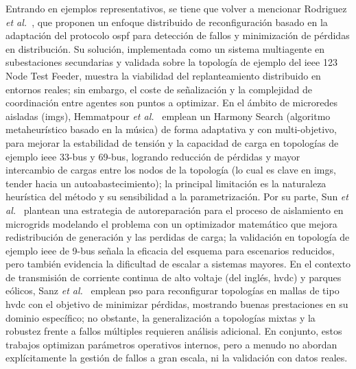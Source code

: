 Entrando en ejemplos representativos, se tiene que volver a mencionar Rodriguez \textit{et al.}~\cite{Rodriguez16}, que proponen un enfoque distribuido de reconfiguración basado en la adaptación del protocolo \gls{ospf} para detección de fallos y minimización de pérdidas en distribución. Su solución, implementada como un sistema multiagente en subestaciones secundarias y validada sobre la topología de ejemplo del \gls{ieee} 123 Node Test Feeder, muestra la viabilidad del replanteamiento distribuido en entornos reales; sin embargo, el coste de señalización y la complejidad de coordinación entre agentes son puntos a optimizar. En el ámbito de microredes aisladas (\gls{imgs}), Hemmatpour \textit{et al.}~\cite{hemmatpour2016optimum} emplean un Harmony Search (algoritmo metaheurístico basado en la música) de forma adaptativa y con multi-objetivo, para mejorar la estabilidad de tensión y la capacidad de carga en topologías de ejemplo \gls{ieee} 33-bus y 69-bus, logrando reducción de pérdidas y mayor intercambio de cargas entre los nodos de la topología (lo cual es clave en \gls{imgs}, tender hacia un autoabastecimiento); la principal limitación es la naturaleza heurística del método y su sensibilidad a la parametrización. Por su parte, Sun \textit{et al.}~\cite{sun2018optimal} plantean una estrategia de autoreparación para el proceso de aislamiento en microgrids modelando el problema con un optimizador matemático que mejora redistribución de generación y las perdidas de carga; la validación en topología de ejemplo \gls{ieee} de 9-bus señala la eficacia del esquema para escenarios reducidos, pero también evidencia la dificultad de escalar a sistemas mayores. En el contexto de transmisión  de corriente continua de alto voltaje (del inglés, \gls{hvdc}) y parques eólicos, Sanz \textit{et al.}~\cite{sanz2017reconfiguration} emplean \gls{pso} para reconfigurar topologías en mallas de tipo \gls{hvdc} con el objetivo de minimizar pérdidas, mostrando buenas prestaciones en su dominio específico; no obstante, la generalización a topologías mixtas y la robustez frente a fallos múltiples requieren análisis adicional. En conjunto, estos trabajos optimizan parámetros operativos internos, pero a menudo no abordan explícitamente la gestión de fallos a gran escala, ni la validación con datos reales.\\
\\
